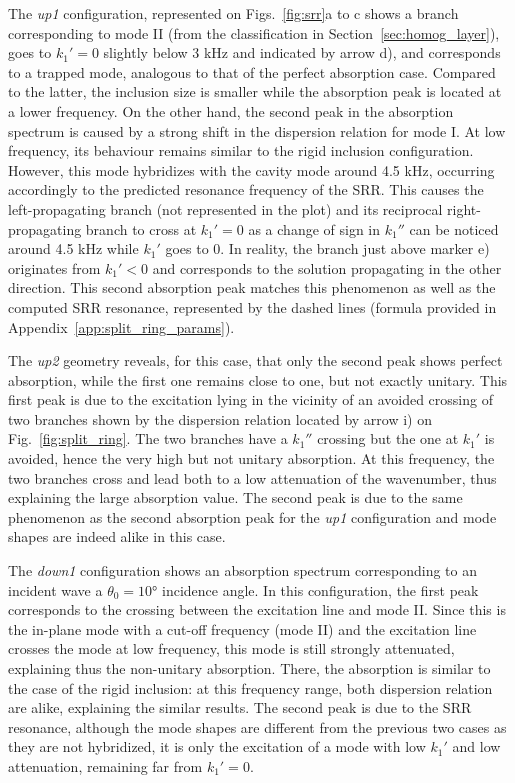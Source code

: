The \emph{up1} configuration, represented on Figs.~\ref{fig:srr}a to c shows a branch corresponding to mode II (from the classification in Section~\ref{sec:homog_layer}), goes to $k_1'=0$ slightly below 3 kHz and indicated by arrow d), and corresponds to a trapped mode, analogous to that of the perfect absorption case. Compared to the latter, the inclusion size is smaller while the absorption peak is located at a lower frequency. On the other hand, the second peak in the absorption spectrum is caused by a strong shift in the dispersion relation for mode I. At low frequency, its behaviour remains similar to the rigid inclusion configuration. However, this mode hybridizes with the cavity mode around 4.5 kHz, occurring accordingly to the predicted resonance frequency of the SRR. This causes the left-propagating branch (not represented in the plot) and its reciprocal right-propagating branch to cross at $k_1'=0$ as a change of sign in $k_1''$ can be noticed around 4.5 kHz while $k_1'$ goes to 0. In reality, the branch just above marker e) originates from $k_1'<0$ and corresponds to the solution propagating in the other direction. This second absorption peak matches this phenomenon as well as the computed SRR resonance, represented by the dashed lines (formula provided in Appendix~\ref{app:split_ring_params}).

The \emph{up2} geometry reveals, for this case, that only the second peak shows perfect absorption, while the first one remains close to one, but not exactly unitary. This first peak is due to the excitation lying in the vicinity of an avoided crossing of two branches shown by the dispersion relation located by arrow i) on Fig.~\ref{fig:split_ring}. The two branches have a $k_1''$ crossing but the one at $k_1'$ is avoided, hence the very high but not unitary absorption. At this frequency, the two branches cross and lead both to a low attenuation of the wavenumber, thus explaining the large absorption value. The second peak is due to the same phenomenon as the second absorption peak for the \emph{up1} configuration and mode shapes are indeed alike in this case. 

The \emph{down1} configuration shows an absorption spectrum corresponding to an incident wave a $\theta_0 = 10$° incidence angle. In this configuration, the first peak corresponds to the crossing between the excitation line and mode II. Since this is the in-plane mode with a cut-off frequency (mode II) and the excitation line crosses the mode at low frequency, this mode is still strongly attenuated, explaining thus the non-unitary absorption. There, the absorption is similar to the case of the rigid inclusion: at this frequency range, both dispersion relation are alike, explaining the similar results. The second peak is due to the SRR resonance, although the mode shapes are different from the previous two cases as they are not hybridized, it is only the excitation of a mode with low $k_1'$ and low attenuation, remaining far from $k_1'=0$.


